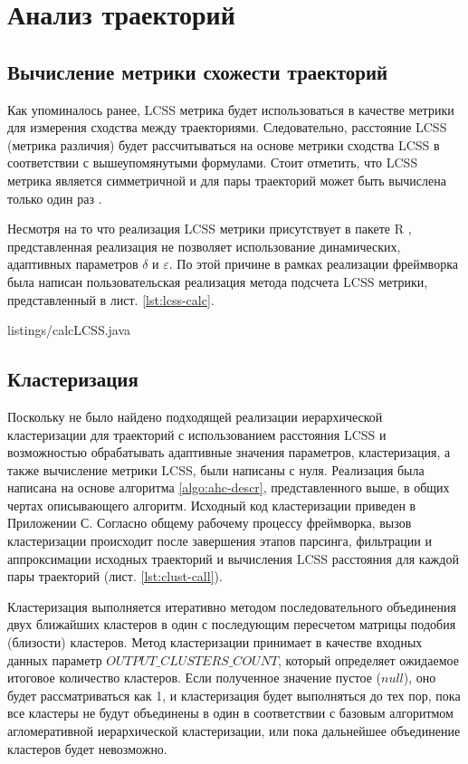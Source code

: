 \section{Анализ траекторий}
\subsection{Вычисление метрики схожести траекторий}

Как упоминалось ранее, LCSS метрика будет использоваться в качестве метрики для измерения сходства между траекториями. Следовательно, расстояние LCSS (метрика различия) будет рассчитываться на основе метрики сходства LCSS в соответствии с вышеупомянутыми формулами. Стоит отметить, что LCSS метрика является симметричной и для пары траекторий может быть вычислена только один раз \cite{inproceedings:28_lcss_dsmt}.

Несмотря на то что реализация LCSS метрики присутствует в пакете R \cite{online:r_lcss}, представленная реализация не позволяет использование динамических, адаптивных параметров $\delta$ и $\varepsilon$. По этой причине в рамках реализации фреймворка была написан пользовательская реализация метода подсчета LCSS метрики, представленный в лист. \ref{lst:lcss-calc}.

 {listings/calcLCSS.java}

\subsection{Кластеризация}

Поскольку не было найдено подходящей реализации иерархической кластеризации для траекторий с использованием расстояния LCSS и возможностью обрабатывать адаптивные значения параметров, кластеризация, а также вычисление метрики LCSS, были написаны с нуля. Реализация была написана на основе алгоритма \ref{algo:ahc-descr}, представленного выше, в общих чертах описывающего алгоритм. Исходный код кластеризации приведен в Приложении С. Согласно общему рабочему процессу фреймворка, вызов кластеризации происходит после завершения этапов парсинга, фильтрации и аппроксимации исходных траекторий и вычисления LCSS расстояния для каждой пары траекторий (лист. \ref{lst:clust-call}).



Кластеризация выполняется итеративно методом последовательного объединения двух ближайших кластеров в один с последующим пересчетом матрицы подобия (близости) кластеров. Метод кластеризации принимает в качестве входных данных параметр $OUTPUT\_CLUSTERS\_COUNT$, который определяет ожидаемое итоговое количество кластеров. Если полученное значение пустое ($null$), оно будет рассматриваться как 1, и кластеризация будет выполняться до тех пор, пока все кластеры не будут объединены в один в соответствии с базовым алгоритмом агломеративной иерархической кластеризации, или пока дальнейшее объединение кластеров будет невозможно.


